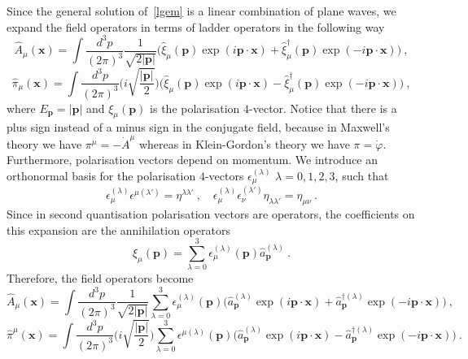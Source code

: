     Since the general solution of~\eqref{lgem} is a linear combination of plane waves, we expand the field operators in terms of ladder operators in the following way
    \begin{equation*}
        \hat A_\mu (\mathbf x) = \int \frac{d^3 p}{(2\pi)^3} \frac{1}{\sqrt{2 |\mathbf p|}} \Big ( \hat \xi_\mu (\mathbf p) \exp(i \mathbf p \cdot \mathbf x) + \hat \xi_\mu^\dagger (\mathbf p) \exp(- i \mathbf p \cdot \mathbf x)) ~,
    \end{equation*}
    \begin{equation*}
        \hat \pi_\mu (\mathbf x) = \int \frac{d^3 p}{(2\pi)^3} \Big ( i \sqrt{\frac{|\mathbf p|}{2}} \Big ) \Big ( \hat \xi_\mu (\mathbf p) \exp(i \mathbf p \cdot \mathbf x) - \hat \xi_\mu^\dagger (\mathbf p) \exp(- i \mathbf p \cdot \mathbf x)) ~,
    \end{equation*}
    where $E_{\mathbf p} = |\mathbf p|$ and $\xi_\mu (\mathbf p)$ is the polarisation $4$-vector. Notice that there is a plus sign instead of a minus sign in the conjugate field, because in Maxwell's theory we have $\pi^\mu = - \dot A^\mu$ whereas in Klein-Gordon's theory we have $\pi = \dot \varphi$. Furthermore, polarisation vectors depend on momentum.
    We introduce an orthonormal basis for the polarisation $4$-vectors $\epsilon_\mu^{(\lambda)}$ $\lambda = 0, 1, 2, 3$, such that 
    \begin{equation*}
        \epsilon_\mu^{(\lambda)} \epsilon^{\mu (\lambda')} = \eta^{\lambda \lambda'} ~, \quad \epsilon_\mu^{(\lambda)} \epsilon_\nu^{(\lambda')} \eta_{\lambda \lambda'} = \eta_{\mu\nu} ~.
    \end{equation*}
    Since in second quantisation polarisation vectors are operators, the coefficients on this expansion are the annihilation operators
    \begin{equation*}
        \hat \xi_\mu (\mathbf p) = \sum_{\lambda=0}^3 \epsilon_\mu^{(\lambda)} (\mathbf p) \hat a_{\mathbf p}^{(\lambda)} ~.
    \end{equation*}
    Therefore, the field operators become
    \begin{equation}\label{max:a}
        \hat A_\mu (\mathbf x) = \int \frac{d^3 p}{(2\pi)^3} \frac{1}{\sqrt{2 |\mathbf p|}} \sum_{\lambda=0}^{3} \epsilon_\mu^{(\lambda)} (\mathbf p) \Big ( \hat a_{\mathbf p}^{(\lambda)} \exp(i \mathbf p \cdot \mathbf x) + \hat a_{\mathbf p}^{\dagger (\lambda)}  \exp(- i \mathbf p \cdot \mathbf x) \Big)  ~,
    \end{equation}
    \begin{equation}\label{max:p}
        \hat \pi^\mu (\mathbf x) = \int \frac{d^3 p}{(2\pi)^3} \Big (i \sqrt{\frac{|\mathbf p|}{2}} \Big ) \sum_{\lambda=0}^{3} \epsilon^{\mu(\lambda)} (\mathbf p) \Big ( \hat a_{\mathbf p}^{(\lambda)} \exp(i \mathbf p \cdot \mathbf x) - \hat a_{\mathbf p}^{\dagger (\lambda)}  \exp(- i \mathbf p \cdot \mathbf x) \Big)  ~.
    \end{equation}
